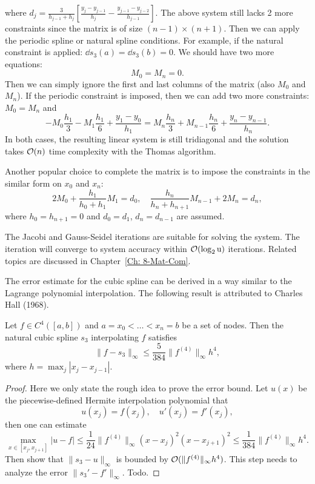 where $d_j = \frac{3}{h_{j-1} + h_{j}}\left[ \frac{y_{j} - y_{j-1}}{h_{j}} - \frac{y_{j-1} - y_{j-2}}{h_{j-1}}\right]$. 
The above system still lacks 2 more constraints since the matrix is of size $(n-1)\times (n+1)$. Then we can apply the periodic spline or natural spline conditions. For example, if the natural constraint is applied: $\dd{s_3}(a) = \dd{s_3}(b) = 0$. We should have two more equations: 
\begin{equation}
    M_{0} = M_{n} = 0.
\end{equation} 
Then we can simply ignore the first and last columns of the matrix (also $M_0$ and $M_n$). 
If the periodic constraint is imposed, then we can add two more constraints: $M_0 = M_{n}$ and 
$$-M_0 \frac{h_{1}}{3} - M_1 \frac{h_1}{6} + \frac{y_1 - y_0}{h_1} = M_n \frac{h_n}{3} + M_{n-1} \frac{h_n}{6} + \frac{y_n - y_{n-1}}{h_n}.$$
In both cases, the resulting linear system is still tridiagonal and the solution takes $\mathcal O(n)$ time complexity with the Thomas algorithm. 

Another popular choice to complete the matrix is to impose the constraints in the similar form on $x_0$ and $x_n$: 
\begin{equation}
\label{EQ: EXTENSION}
    2M_0 + \frac{h_1}{h_0 + h_1} M_1 = d_0,\quad  \frac{h_n}{h_{n} + h_{n+1}} M_{n-1} + 2M_n = d_n,
\end{equation}
where $h_0 = h_{n+1} = 0$ and $d_0 = d_1$, $d_{n} = d_{n-1}$ are assumed. 
\begin{remark}
The Jacobi and Gauss-Seidel iterations are suitable for solving the system. The iteration will converge to system accuracy within $\mathcal O(\log_2 \textup{u})$ iterations. Related topics are discussed in Chapter~\ref{Ch: 8-Mat-Com}.
\end{remark}
The error estimate for the cubic spline can be derived in a way similar to the Lagrange polynomial interpolation. The following result is attributed to Charles Hall (1968).
\begin{theorem}\label{THM: ERROR CUBIC SPLINE}
    Let $f\in C^4([a, b])$ and $a = x_0 < \dots < x_n = b$ be a set of nodes. Then the natural cubic spline $s_3$ interpolating $f$ satisfies 
    \begin{equation}
        \|f - s_3\|_{\infty} \le \frac{5}{384}\|f^{(4)}\|_{\infty} h^4,
    \end{equation}
    where $h = \max_j |x_j - x_{j-1}|$.
\end{theorem}
\begin{proof}
    Here we only state the rough idea to prove the error bound. Let $u(x)$ be the piecewise-defined Hermite interpolation polynomial that 
    \begin{equation}
        u(x_j)=f(x_j), \quad u'(x_j) = f'(x_j),
    \end{equation}
    then one can estimate 
    \begin{equation}
        \max_{x\in [x_j, x_{j+1}]} |u-f|\le  \frac{1}{24}\|f^{(4)}\|_{\infty} (x - x_j)^2 (x - x_{j+1})^2 \le \frac{1}{384}\|f^{(4)}\|_{\infty} h^4.
    \end{equation}
    Then show that $\|s_3 - u\|_{\infty}$ is bounded by $\mathcal O(\|f^{(4)}\|_{\infty} h^4)$. This step needs to analyze the error $\|s_3' - f'\|_{\infty}$. Todo.
\end{proof}

